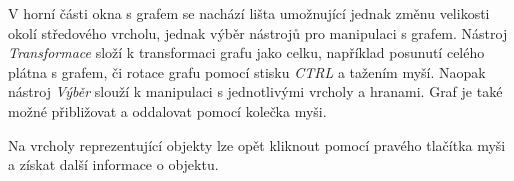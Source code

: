\documentclass[12pt,a4paper]{report}
\begin{document}
V horní části okna s grafem se nachází lišta umožnující jednak změnu velikosti okolí středového vrcholu, jednak výběr nástrojů pro manipulaci s grafem. Nástroj \emph{Transformace} složí k transformaci grafu jako celku, například posunutí celého plátna s grafem, či rotace grafu pomocí stisku \emph{CTRL} a tažením myší. Naopak nástroj \emph{Výběr} slouží k manipulaci s jednotlivými vrcholy a hranami. Graf je také možné přibližovat a oddalovat pomocí kolečka myši.

Na vrcholy reprezentující objekty lze opět kliknout pomocí pravého tlačítka myši a získat další informace o objektu.

\end{document}
